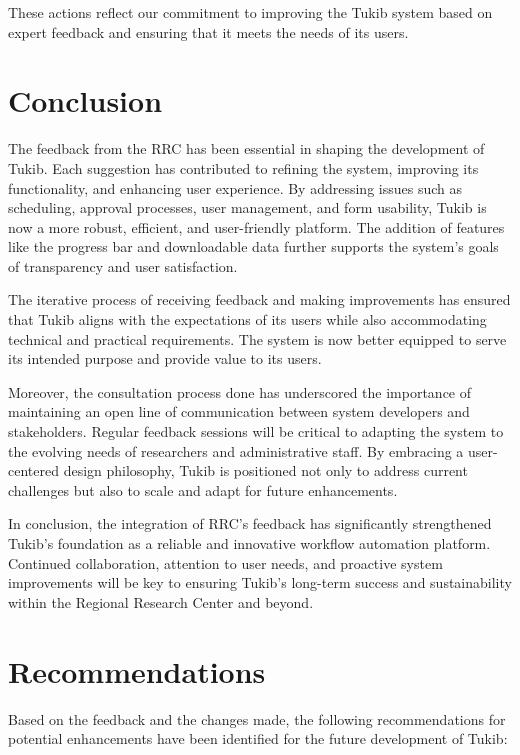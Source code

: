 These actions reflect our commitment to improving the Tukib system based on expert feedback and ensuring that it meets the needs of its users.

\section{Conclusion}
The feedback from the RRC has been essential in shaping the development of Tukib. Each suggestion has contributed to refining the system, improving its functionality, and enhancing user experience. By addressing issues such as scheduling, approval processes, user management, and form usability, Tukib is now a more robust, efficient, and user-friendly platform. The addition of features like the progress bar and downloadable data further supports the system’s goals of transparency and user satisfaction.

The iterative process of receiving feedback and making improvements has ensured that Tukib aligns with the expectations of its users while also accommodating technical and practical requirements. The system is now better equipped to serve its intended purpose and provide value to its users.

Moreover, the consultation process done has underscored the importance of maintaining an open line of communication between system developers and stakeholders. Regular feedback sessions will be critical to adapting the system to the evolving needs of researchers and administrative staff. By embracing a user-centered design philosophy, Tukib is positioned not only to address current challenges but also to scale and adapt for future enhancements.

In conclusion, the integration of RRC’s feedback has significantly strengthened Tukib’s foundation as a reliable and innovative workflow automation platform. Continued collaboration, attention to user needs, and proactive system improvements will be key to ensuring Tukib’s long-term success and sustainability within the Regional Research Center and beyond.

\section{Recommendations}
Based on the feedback and the changes made, the following recommendations for potential enhancements have been identified for the future development of Tukib:

